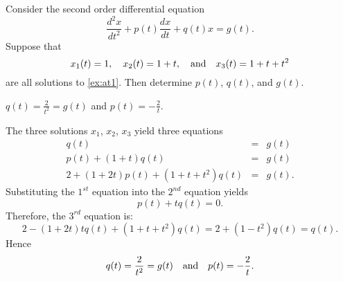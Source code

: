 \documentclass{ximera}
\begin{document}
\begin{exercise} \label{c14.3.4}
Consider the second order differential equation
\begin{equation}  \label{ex:at1}
\frac{d^2x}{dt^2} + p(t)\frac{dx}{dt} + q(t)x = g(t).
\end{equation}
Suppose that
\[
x_1(t) = 1, \quad  x_2(t) = 1+t, \quad\mbox{and}\quad x_3(t) = 1+t+t^2
\]
are all solutions to \eqref{ex:at1}.  Then determine $p(t)$, $q(t)$, and
$g(t)$.

\begin{solution}
\ans $q(t) = \frac{2}{t^2} = g(t)$ and  
$p(t) = -\frac{2}{t}$.

\soln  The three solutions $x_1$, $x_2$, $x_3$ yield three equations
\begin{eqnarray*}
q(t) & = & g(t)\\
p(t) +(1+t)q(t) & = & g(t)\\
2 + (1+2t)p(t) + (1+t+t^2)q(t) & = & g(t).
\end{eqnarray*}
Substituting the $1^{st}$ equation into the $2^{nd}$ equation yields
\[
p(t) + tq(t) = 0.
\]
Therefore, the $3^{rd}$ equation is:
\[
2 - (1+2t)tq(t) + (1+t+t^2)q(t) = 2 + (1-t^2)q(t) = q(t).
\]
Hence 
\[
q(t) = \frac{2}{t^2} = g(t) \quad\mbox{and}\quad  p(t) = -\frac{2}{t}.
\]

\end{solution}
\end{exercise}
\end{document}
